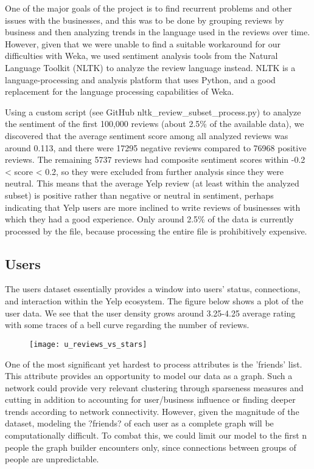 One of the major goals of the project is to find recurrent problems and other issues with the businesses, and this was to be done by grouping reviews by business and then analyzing trends in the language used in the reviews over time. However, given that we were unable to find a suitable workaround for our difficulties with Weka, we used sentiment analysis tools from the Natural Language Toolkit (NLTK) to analyze the review language instead. NLTK is a language-processing and analysis platform that uses Python, and a good replacement for the language processing capabilities of Weka. 

\quad Using a custom script (see GitHub\; nltk\_review\_subset\_process.py) to analyze the sentiment of the first 100,000 reviews (about 2.5\% of the available data), we discovered that the average sentiment score among all analyzed reviews was around 0.113, and there were 17295 negative reviews compared to 76968 positive reviews. The remaining 5737 reviews had composite sentiment scores within -0.2 < score < 0.2, so they were excluded from further analysis since they were neutral. This means that the average Yelp review (at least within the analyzed subset) is positive rather than negative or neutral in sentiment, perhaps indicating that Yelp users are more inclined to write reviews of businesses with which they had a good experience. Only around 2.5\% of the data is currently processed by the file, because processing the entire file is prohibitively expensive.

\subsection{Users}

The users dataset essentially provides a window into users' status, connections, and interaction within the Yelp ecosystem. The figure below shows a plot of the user data. We see that the user density grows around 3.25-4.25 average rating with some traces of a bell curve regarding the number of reviews.

\begin{figure}[!h]
\texttt{[image: u\_reviews\_vs\_stars]}
\end{figure}

\quad One of the most significant yet hardest to process attributes is the 'friends' list. This attribute provides an opportunity to model our data as a graph. Such a network could provide very relevant clustering through sparseness measures and cutting in addition to accounting for user/business influence or finding deeper trends according to network connectivity. However, given the magnitude of the dataset, modeling the ?friends? of each user as a complete graph will be computationally difficult. To combat this, we could limit our model to the first n people the graph builder encounters only, since connections between groups of people are unpredictable.

